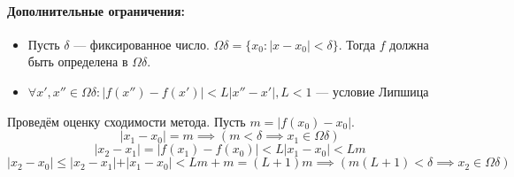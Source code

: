 \paragraph{Дополнительные ограничения:} \begin{itemize}
    \item Пусть $\delta$ --- фиксированное число. $\Omega\delta = \{x_0: \vert x - x_0 \vert < \delta \}$. Тогда $f$ должна быть определена в $\Omega \delta$.
    \item $\forall x', x'' \in \Omega\delta: \vert f(x'') - f(x') \vert < L\vert x'' - x' \vert, L < 1$ --- условие Липшица
\end{itemize}
Проведём оценку сходимости метода.
Пусть $m = \vert f(x_0) - x_0 \vert$.
\[
\vert x_1 - x_0\vert = m \implies (m < \delta \implies x_1 \in \Omega\delta)
\]
\[
\vert x_2 - x_1\vert = \vert f(x_1) - f(x_0) \vert < L \vert x_1 - x_0 \vert < Lm
\]
\[
\vert x_2 - x_0\vert \leq \vert x_2 - x_1 \vert + \vert x_1 - x_0 \vert < Lm + m = (L + 1)m \implies (m(L+1) < \delta \implies x_2 \in \Omega\delta)
\]